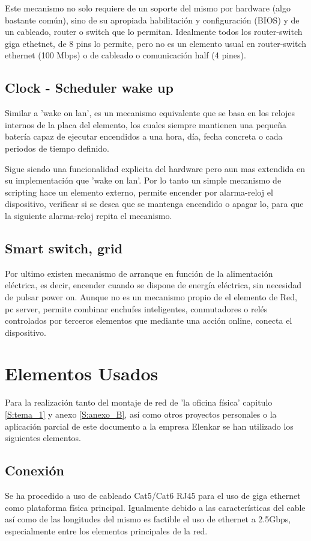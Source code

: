 Este mecanismo no solo requiere de un soporte del mismo por hardware (algo bastante común), sino de su apropiada habilitación y configuración (BIOS) y de un cableado, router o switch que lo permitan. Idealmente todos los router-switch giga ethetnet, de 8 pins lo permite, pero no es un elemento usual en router-switch ethernet (100 Mbps) o de cableado o comunicación half (4 pines).

\subsection{Clock - Scheduler wake up}
Similar a 'wake on lan', es un mecanismo equivalente que se basa en los relojes internos de la placa del elemento, los cuales siempre mantienen una pequeña batería capaz de ejecutar encendidos a una hora, día, fecha concreta o cada periodos de tiempo definido.

Sigue siendo una funcionalidad explicita del hardware pero aun mas extendida en su implementación que 'wake on lan'. Por lo tanto un simple mecanismo de scripting hace un elemento externo, permite encender por alarma-reloj el dispositivo, verificar si se desea que se mantenga encendido o apagar lo, para que la siguiente alarma-reloj repita el mecanismo.

\subsection{Smart switch, grid}
Por ultimo existen mecanismo de arranque en función de la alimentación eléctrica, es decir, encender cuando se dispone de energía eléctrica, sin necesidad de pulsar power on. Aunque no es un mecanismo propio de el elemento de Red, pc server, permite combinar enchufes inteligentes, conmutadores o relés controlados por terceros elementos que mediante una acción online, conecta el dispositivo.


\section{Elementos Usados}
Para la realización tanto del montaje de red de 'la oficina física' capitulo \ref{S:tema_1} y anexo \ref{S:anexo_B}, así como otros proyectos personales o la aplicación parcial de este documento a la empresa Elenkar se han utilizado los siguientes elementos.

\subsection{Conexión}
Se ha procedido a uso de cableado Cat5/Cat6 RJ45 para el uso de giga ethernet como plataforma física principal. Igualmente debido a las características del cable así como de las longitudes del mismo es factible el uso de ethernet a 2.5Gbps, especialmente entre los elementos principales de la red.

